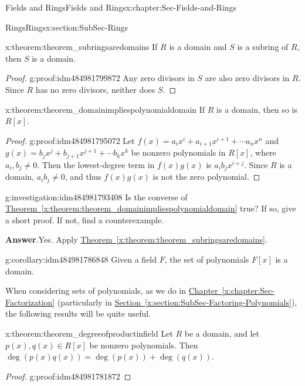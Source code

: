 \documentclass[oneside,10pt,]{book}
\newcommand{\blocktitlefont}{\relax}
\newcommand{\xreffont}{\relax}
\numberwithin{equation}{section}
\begin{document}
\begin{chapterptx}{Fields and Rings}{}{Fields and Rings}{}{}{x:chapter:Sec-Fields-and-Rings}
\begin{sectionptx}{Rings}{}{Rings}{}{}{x:section:SubSec-Rings}
\begin{theorem}{}{}{x:theorem:theorem_subringsaredomains}
If \(R\) is a domain and \(S\) is a subring of \(R\), then \(S\) is a domain.%
\end{theorem}
\begin{proof}{}{g:proof:idm484981799872}
Any zero divisors in \(S\) are also zero divisors in \(R\). Since \(R\) has no zero divisors, neither does \(S\).%
\end{proof}
\begin{theorem}{}{}{x:theorem:theorem_domainimpliespolynomialdomain}%
If \(R\) is a domain, then so is \(R[x]\).%
\end{theorem}
\begin{proof}{}{g:proof:idm484981795072}
Let \(f(x) = a_i x^i + a_{i+1} x^{i+1} + \cdots a_n x^n\) and \(g(x) = b_j x^j + b_{j+1} x^{j+1} + \cdots b_k x^k\) be nonzero polynomials in \(R[x]\), where \(a_i, b_j \ne 0\). Then the lowest-degree term in \(f(x) g(x)\) is \(a_i b_j x^{i+j}\). Since \(R\) is a domain, \(a_i b_j\ne 0\), and thus \(f(x)g(x)\) is not the zero polynomial.%
\end{proof}
\begin{investigation}{}{g:investigation:idm484981793408}%
Is the converse of \hyperref[x:theorem:theorem_domainimpliespolynomialdomain]{Theorem~{\xreffont\ref{x:theorem:theorem_domainimpliespolynomialdomain}}} true? If so, give a short proof. If not, find a counterexample.%
\par\smallskip%
\noindent\textbf{\blocktitlefont Answer}.\hypertarget{g:answer:idm484981788000}{}\quad{}Yes. Apply \hyperref[x:theorem:theorem_subringsaredomains]{Theorem~{\xreffont\ref{x:theorem:theorem_subringsaredomains}}}.%
\end{investigation}
\begin{corollary}{}{}{g:corollary:idm484981786848}%
Given a field \(F\), the set of polynomials \(F[x]\) is a domain.%
\end{corollary}
When considering sets of polynomials, as we do in \hyperref[x:chapter:Sec-Factorization]{Chapter~{\xreffont\ref{x:chapter:Sec-Factorization}}} (particularly in \hyperref[x:section:SubSec-Factoring-Polynomials]{Section~{\xreffont\ref{x:section:SubSec-Factoring-Polynomials}}}), the following results will be quite useful.%
\begin{theorem}{}{}{x:theorem:theorem_degreeofproductinfield}%
Let \(R\) be a domain, and let \(p(x),q(x)\in R[x]\) be nonzero polynomials. Then \(\deg(p(x) q(x)) = \deg(p(x)) + \deg(q(x))\).%
\end{theorem}
\begin{proof}{}{g:proof:idm484981781872}

\end{proof}
\end{sectionptx}
\end{chapterptx}
\end{document}
